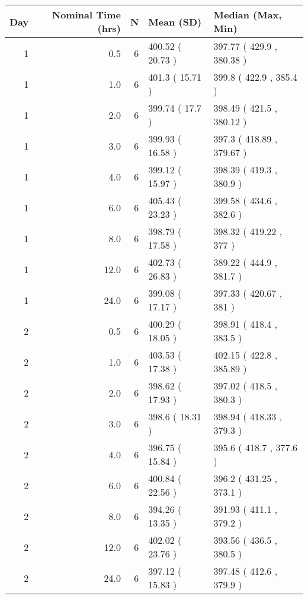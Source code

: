 
\begin{tabular}{rrrll}
\toprule
Day & Nominal Time (hrs) & N & Mean (SD) & Median (Max, Min)\\
\midrule
1 & 0.5 & 6 & 400.52 ( 20.73 ) & 397.77 ( 429.9 , 380.38 )\\
1 & 1.0 & 6 & 401.3 ( 15.71 ) & 399.8 ( 422.9 , 385.4 )\\
1 & 2.0 & 6 & 399.74 ( 17.7 ) & 398.49 ( 421.5 , 380.12 )\\
1 & 3.0 & 6 & 399.93 ( 16.58 ) & 397.3 ( 418.89 , 379.67 )\\
1 & 4.0 & 6 & 399.12 ( 15.97 ) & 398.39 ( 419.3 , 380.9 )\\
1 & 6.0 & 6 & 405.43 ( 23.23 ) & 399.58 ( 434.6 , 382.6 )\\
1 & 8.0 & 6 & 398.79 ( 17.58 ) & 398.32 ( 419.22 , 377 )\\
1 & 12.0 & 6 & 402.73 ( 26.83 ) & 389.22 ( 444.9 , 381.7 )\\
1 & 24.0 & 6 & 399.08 ( 17.17 ) & 397.33 ( 420.67 , 381 )\\
2 & 0.5 & 6 & 400.29 ( 18.05 ) & 398.91 ( 418.4 , 383.5 )\\
2 & 1.0 & 6 & 403.53 ( 17.38 ) & 402.15 ( 422.8 , 385.89 )\\
2 & 2.0 & 6 & 398.62 ( 17.93 ) & 397.02 ( 418.5 , 380.3 )\\
2 & 3.0 & 6 & 398.6 ( 18.31 ) & 398.94 ( 418.33 , 379.3 )\\
2 & 4.0 & 6 & 396.75 ( 15.84 ) & 395.6 ( 418.7 , 377.6 )\\
2 & 6.0 & 6 & 400.84 ( 22.56 ) & 396.2 ( 431.25 , 373.1 )\\
2 & 8.0 & 6 & 394.26 ( 13.35 ) & 391.93 ( 411.1 , 379.2 )\\
2 & 12.0 & 6 & 402.02 ( 23.76 ) & 393.56 ( 436.5 , 380.5 )\\
2 & 24.0 & 6 & 397.12 ( 15.83 ) & 397.48 ( 412.6 , 379.9 )\\
\bottomrule
\end{tabular}
